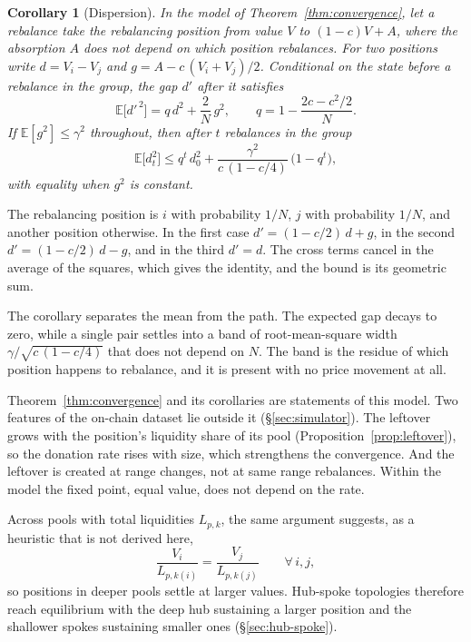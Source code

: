 \documentclass[11pt,a4paper]{article}
\theoremstyle{siphon}
\newtheorem{corollary}{Corollary}[theorem]
\begin{document}
\begin{corollary}[Dispersion]\label{cor:dispersion}
In the model of Theorem~\ref{thm:convergence}, let a rebalance take the rebalancing position from value $V$ to $(1 - c)V + A$, where the absorption $A$ does not depend on which position rebalances. For two positions write $d = V_i - V_j$ and $g = A - c\,(V_i + V_j)/2$. Conditional on the state before a rebalance in the group, the gap $d'$ after it satisfies
\[
\mathbb{E}\bigl[d'^{\,2}\bigr] = q\,d^{2} + \frac{2}{N}\,g^{2},
\qquad
q = 1 - \frac{2c - c^{2}/2}{N}.
\]
If $\mathbb{E}[g^{2}] \leq \gamma^{2}$ throughout, then after $t$ rebalances in the group
\[
\mathbb{E}\bigl[d_t^{2}\bigr] \leq q^{t}\,d_0^{2} + \frac{\gamma^{2}}{c\,(1 - c/4)}\,\bigl(1 - q^{t}\bigr),
\]
with equality when $g^{2}$ is constant.
\end{corollary}

\noindent The rebalancing position is $i$ with probability $1/N$, $j$ with probability $1/N$, and another position otherwise. In the first case $d' = (1 - c/2)\,d + g$, in the second $d' = (1 - c/2)\,d - g$, and in the third $d' = d$. The cross terms cancel in the average of the squares, which gives the identity, and the bound is its geometric sum.

The corollary separates the mean from the path. The expected gap decays to zero, while a single pair settles into a band of root-mean-square width $\gamma/\sqrt{c\,(1 - c/4)}$ that does not depend on $N$. The band is the residue of which position happens to rebalance, and it is present with no price movement at all.

\noindent Theorem~\ref{thm:convergence} and its corollaries are statements of this model. Two features of the on-chain dataset lie outside it (\S\ref{sec:simulator}). The leftover grows with the position's liquidity share of its pool (Proposition~\ref{prop:leftover}), so the donation rate rises with size, which strengthens the convergence. And the leftover is created at range changes, not at same range rebalances. Within the model the fixed point, equal value, does not depend on the rate.

\noindent Across pools with total liquidities $L_{p,k}$, the same argument suggests, as a heuristic that is not derived here,
\begin{equation}\label{eq:multipool}
\frac{V_i}{L_{p,k(i)}}
=
\frac{V_j}{L_{p,k(j)}}
\qquad \forall\, i,j,
\end{equation}
so positions in deeper pools settle at larger values. Hub-spoke topologies therefore reach equilibrium with the deep hub sustaining a larger position and the shallower spokes sustaining smaller ones (\S\ref{sec:hub-spoke}).
\end{document}
